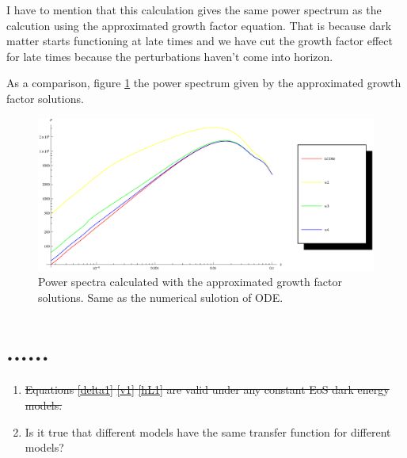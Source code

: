 \documentclass{article}
\begin{document}
I have to mention that this calculation gives the same power spectrum as the calcution using the approximated growth factor equation. That is because dark matter starts functioning at late times and  we have cut the growth factor effect for late times because the perturbations haven't come into horizon.

As a comparison, figure \ref{fig:DEs_Sync-ApproGrowthFactor_Power} the power spectrum given by the approximated growth factor solutions.


\begin{figure}[!htbp]
\centering
\includegraphics[width=400pt]{DEs_Sync-ApproGrowthFactor_Power.eps}
\caption{Power spectra calculated with the approximated growth factor solutions. Same as the numerical sulotion of ODE.}\label{fig:DEs_Sync-ApproGrowthFactor_Power}
\end{figure}



\section{......}

\begin{enumerate}
\item
{\sout{Equations \ref{delta1} \ref{v1} \ref{hL1} are valid under any constant EoS dark energy models.}}
\item \label{TransferFunctionQuestion}
Is it true that different models have the same transfer function for different models?

\end{enumerate}
\end{document}
